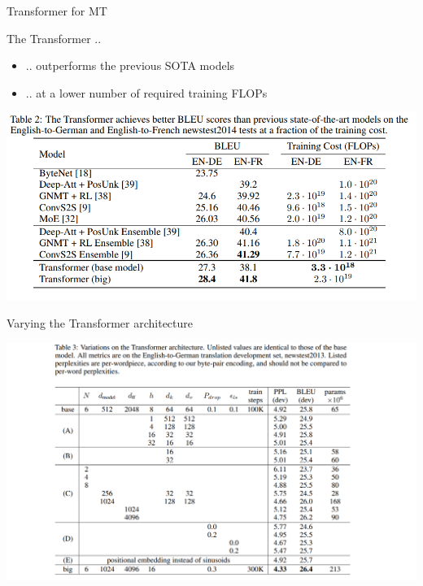 
\begin{vbframe}{Transformer for MT}

\vfill

The Transformer .. 

\begin{itemize}
	\item .. outperforms the previous SOTA models
	\item .. at a lower number of required training FLOPs
\end{itemize}

\vspace{.3cm}

\includegraphics[width=.9\textwidth]{figure/trafo-wmt}

\vfill

\end{vbframe}


\begin{vbframe}{Varying the Transformer architecture}

\vfill

\includegraphics[width=\textwidth]{figure/vary-trafo.png}

\vfill

\end{vbframe}


\endlecture


